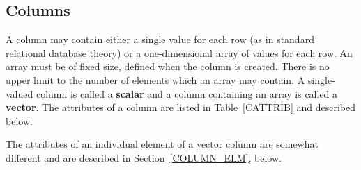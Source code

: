 \subsection{\label{COLS}Columns} 

A column may contain either a single value for each row (as in
standard relational database theory) or a one-dimensional array of 
values for each row. An array must be of fixed size, defined when the
column is created. There is no upper limit to the number of elements
which an array may contain. A single-valued column is called a {\bf 
scalar} and a column containing an array is called  a {\bf vector}.
The attributes of a column are listed in Table~\ref{CATTRIB} and 
described below.

The attributes of an individual element of a vector column are somewhat
different and are described in Section~\ref{COLUMN_ELM}, below.

